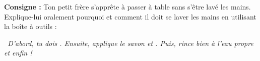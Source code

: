 \documentclass[a4paper,10pt]{article}
\begin{document}
\vspace{3pt}

\begin{tcolorbox}[
  enhanced,
  colback=white,
  colframe=cardborder,
  arc=2mm,boxrule=0.8pt,
  top=4pt,bottom=4pt,left=8pt,right=8pt,
  title={\small\textbf{\textcolor{primary}{\faUserFriends\ Activité 02 : Jeu de rôle en binôme}} \hfill \badge[accent]{Expression Orale}},
  coltitle=primary,colbacktitle=primarylight,titlerule=0.5pt,titlerule style=cardborder
]
{\small
\textbf{Consigne :} Ton petit frère s'apprête à passer à table sans s'être lavé les mains. Explique-lui oralement pourquoi et comment il doit se laver les mains en utilisant la boîte à outils :

\vspace{3pt}
\textit{\faQuoteLeft\ D'abord, tu dois \drule{4cm}. Ensuite, applique le savon et \drule{4cm}. Puis, rince bien à l'eau propre et enfin \drule{4.5cm} !\faQuoteRight}
}
\end{tcolorbox}
\end{document}
